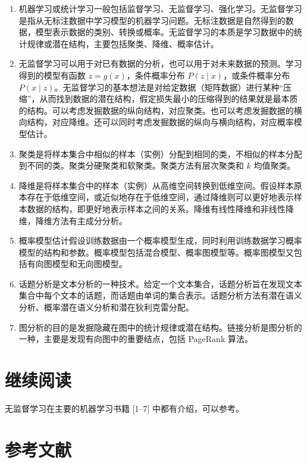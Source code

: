 \documentclass[UTF8, 12pt, fontset=fandol, oneside]{ctexart}
\begin{document}
\begin{enumerate}
  \item 机器学习或统计学习一般包括监督学习、无监督学习、强化学习。无监督学习是指从无标注数据中学习模型的机器学习问题。无标注数据是自然得到的数据，模型表示数据的类别、转换或概率。无监督学习的本质是学习数据中的统计规律或潜在结构，主要包括聚类、降维、概率估计。
  \item 无监督学习可以用于对已有数据的分析，也可以用于对未来数据的预测。学习得到的模型有函数 $z=g(x)$，条件概率分布 $P(z\mid x)$，或条件概率分布 $P(x\mid z)$。无监督学习的基本想法是对给定数据（矩阵数据）进行某种“压缩”，从而找到数据的潜在结构，假定损失最小的压缩得到的结果就是最本质的结构。可以考虑发掘数据的纵向结构，对应聚类。也可以考虑发掘数据的横向结构，对应降维。还可以同时考虑发掘数据的纵向与横向结构，对应概率模型估计。
  \item 聚类是将样本集合中相似的样本（实例）分配到相同的类，不相似的样本分配到不同的类。聚类分硬聚类和软聚类。聚类方法有层次聚类和 $k$ 均值聚类。
  \item 降维是将样本集合中的样本（实例）从高维空间转换到低维空间。假设样本原本存在于低维空间，或近似地存在于低维空间，通过降维则可以更好地表示样本数据的结构，即更好地表示样本之间的关系。降维有线性降维和非线性降维，降维方法有主成分分析。
  \item 概率模型估计假设训练数据由一个概率模型生成，同时利用训练数据学习概率模型的结构和参数。概率模型包括混合模型、概率图模型等。概率图模型又包括有向图模型和无向图模型。
  \item 话题分析是文本分析的一种技术。给定一个文本集合，话题分析旨在发现文本集合中每个文本的话题，而话题由单词的集合表示。话题分析方法有潜在语义分析、概率潜在语义分析和潜在狄利克雷分配。
  \item 图分析的目的是发掘隐藏在图中的统计规律或潜在结构。链接分析是图分析的一种，主要是发现有向图中的重要结点，包括 PageRank 算法。
\end{enumerate}

\section*{继续阅读}

无监督学习在主要的机器学习书籍 [1--7] 中都有介绍，可以参考。

\section*{参考文献}
\end{document}
